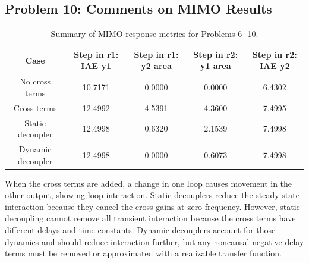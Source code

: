 \documentclass{article}%
\begin{document}
\subsection*{Problem 10: Comments on MIMO Results}%
\label{subsec:Problem10CommentsonMIMOResults}%
\begin{table}[H]%
\centering%
\begin{tabular}{ccccc}%
\hline%
Case&Step in r1: IAE y1&Step in r1: y2 area&Step in r2: y1 area&Step in r2: IAE y2\\%
\hline%
No cross terms&10.7171&0.0000&0.0000&6.4302\\%
\hline%
Cross terms&12.4992&4.5391&4.3600&7.4995\\%
\hline%
Static decoupler&12.4998&0.6320&2.1539&7.4998\\%
\hline%
Dynamic decoupler&12.4998&0.0000&0.6073&7.4998\\%
\hline%
\end{tabular}%
\caption{Summary of MIMO response metrics for Problems 6{-}{-}10.}%
\label{tab:problem10_summary}%
\end{table}%
When the cross terms are added, a change in one loop causes movement in the other output, showing loop interaction. Static decouplers reduce the steady{-}state interaction because they cancel the cross{-}gains at zero frequency. However, static decoupling cannot remove all transient interaction because the cross terms have different delays and time constants. Dynamic decouplers account for those dynamics and should reduce interaction further, but any noncausal negative{-}delay terms must be removed or approximated with a realizable transfer function.%
\par

%
\end{document}
